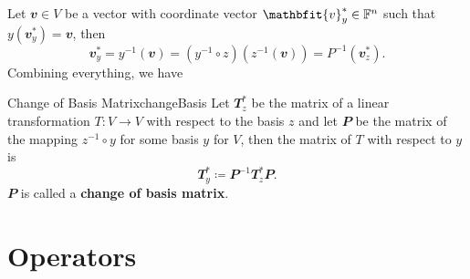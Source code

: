 \documentclass[math, code]{amznotes}
\theoremstyle{remark}
\begin{document}
Let $\mathbfit{v} \in V$ be a vector with coordinate vector $\mathbfit{v}_y^* \in \F^n$ such that $y(\mathbfit{v}_y^*) = \mathbfit{v}$, then 
\begin{equation*}
    \mathbfit{v}^*_y = y^{-1}(\mathbfit{v}) = \left(y^{-1} \circ z\right)\left(z^{-1}(\mathbfit{v})\right) = P^{-1}\left(\mathbfit{v}^*_z\right).
\end{equation*}
Combining everything, we have 
\begin{dfnbox}{Change of Basis Matrix}{changeBasis}
    Let $\mathbfit{T}_z^*$ be the matrix of a linear transformation $T \colon V \to V$ with respect to the basis $z$ and let $\mathbfit{P}$ be the matrix of the mapping $z^{-1} \circ y$ for some basis $y$ for $V$, then the matrix of $T$ with respect to $y$ is 
    \begin{equation*}
        \mathbfit{T}^*_y \coloneqq \mathbfit{P}^{-1}\mathbfit{T}_z^*\mathbfit{P}.
    \end{equation*}
    $\mathbfit{P}$ is called a {\color{red} \textbf{change of basis matrix}}.
\end{dfnbox}
\chapter{Operators}
\end{document}
